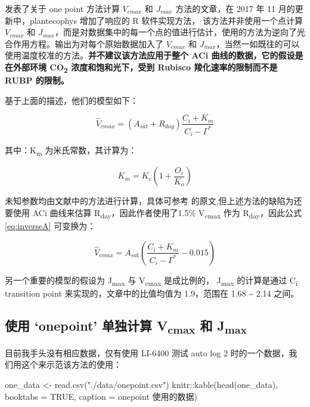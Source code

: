 \documentclass[
]{krantz}
\makeatletter
\newenvironment{Shaded}{\begin{snugshade}}{\end{snugshade}}
\newcommand{\AttributeTok}[1]{\textcolor[rgb]{0.77,0.63,0.00}{#1}}
\newcommand{\ConstantTok}[1]{\textcolor[rgb]{0.00,0.00,0.00}{#1}}
\newcommand{\FunctionTok}[1]{\textcolor[rgb]{0.00,0.00,0.00}{#1}}
\newcommand{\NormalTok}[1]{#1}
\newcommand{\OtherTok}[1]{\textcolor[rgb]{0.56,0.35,0.01}{#1}}
\newcommand{\SpecialCharTok}[1]{\textcolor[rgb]{0.00,0.00,0.00}{#1}}
\newcommand{\StringTok}[1]{\textcolor[rgb]{0.31,0.60,0.02}{#1}}
\newenvironment{kframe}{%
\medskip{}
\setlength{\fboxsep}{.8em}
 \def\at@end@of@kframe{}%
 \ifinner\ifhmode%
  \def\at@end@of@kframe{\end{minipage}}%
  \begin{minipage}{\columnwidth}%
 \fi\fi%
 \def\FrameCommand##1{\hskip\@totalleftmargin \hskip-\fboxsep
 \colorbox{shadecolor}{##1}\hskip-\fboxsep
     \hskip-\linewidth \hskip-\@totalleftmargin \hskip\columnwidth}%
 \MakeFramed {\advance\hsize-\width
   \@totalleftmargin\z@ \linewidth\hsize
   \@setminipage}}%
 {\par\unskip\endMakeFramed%
 \at@end@of@kframe}
\renewenvironment{Shaded}{\begin{kframe}}{\end{kframe}}
\makeatother
\begin{document}
\citet{De2016A} 发表了关于 one point 方法计算 \(V_{cmax}\) 和 \(J_{max}\) 方法的文章，在 2017 年 11 月的更新中，plantecophys 增加了响应的 R 软件实现方法， 该方法并非使用一个点计算 \(V_{cmax}\) 和 \(J_{max}\)，而是对数据集中的每一个点的值进行估计，使用的方法为逆向了光合作用方程。输出为对每个原始数据加入了 \(V_{cmax}\) 和 \(J_{max}\)，当然一如既往的可以使用温度校准的方法。\textbf{并不建议该方法应用于整个 ACi 曲线的数据，它的假设是在外部环境 CO\textsubscript{2} 浓度和饱和光下，受到 Rubisco 羧化速率的限制而不是 RUBP 的限制。}

基于上面的描述，他们的模型如下：

\begin{equation}
\hat{V}_{cmax} = (A_{sat} + R_{day}) \frac{C_i + K_m}{C_i - \Gamma^*} 
\label{eq:inverseA}
\end{equation}

其中：K\textsubscript{m} 为米氏常数，其计算为：

\begin{equation}
K_m = K_c (1 + \frac{O_i}{K_o}) 
\label{eq:km}
\end{equation}

未知参数均由文献中的方法进行计算，具体可参考 \citet{De2016A} 的原文,但上述方法的缺陷为还要使用 ACi 曲线来估算 R\textsubscript{day}，因此作者使用了1.5\% V\textsubscript{cmax} 作为 R\textsubscript{day}，因此公式 \eqref{eq:inverseA} 可变换为：

\begin{equation}
\hat{V}_{cmax} = A_{sat} (\frac{C_i + K_m}{C_i - \Gamma^*} - 0.015)
\label{eq:onepoint}
\end{equation}

另一个重要的模型的假设为 J\textsubscript{max} 与 V\textsubscript{cmax} 是成比例的， J\textsubscript{max} 的计算是通过 C\textsubscript{i} transition point 来实现的，文章中的比值均值为 1.9，范围在 1.68 \textasciitilde{} 2.14 之间。

\hypertarget{onpoint_fit}{%
\subsection{\texorpdfstring{使用 `onepoint' 单独计算 V\textsubscript{cmax} 和 J\textsubscript{max}}{使用 `onepoint' 单独计算 Vcmax 和 Jmax}}\label{onpoint_fit}}

目前我手头没有相应数据，仅有使用 LI-6400 测试 auto log 2 时的一个数据，我们用这个来示范该方法的使用：

\begin{Shaded}
\begin{Highlighting}[]
\NormalTok{one\_data }\OtherTok{\textless{}{-}} \FunctionTok{read.csv}\NormalTok{(}\StringTok{"./data/onepoint.csv"}\NormalTok{)}
\NormalTok{knitr}\SpecialCharTok{::}\FunctionTok{kable}\NormalTok{(}\FunctionTok{head}\NormalTok{(one\_data), }\AttributeTok{booktabs =} \ConstantTok{TRUE}\NormalTok{,}
             \AttributeTok{caption =} \StringTok{\textquotesingle{}onepoint 使用的数据\textquotesingle{}}\NormalTok{)}
\end{Highlighting}
\end{Shaded}
\end{document}
